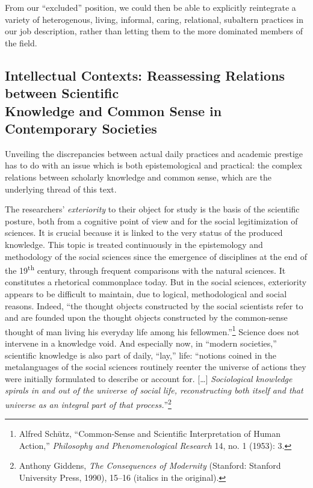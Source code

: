\documentclass{tufte-handout}
\begin{document}
From our ``excluded'' position, we could then be able to explicitly
reintegrate a variety of heterogenous, living, informal, caring,
relational, subaltern practices in our job description, rather than
letting them to the more dominated members of the field.

\hypertarget{intellectual-contexts-reassessing-relations-between-scientific-knowledge-and-common-sense-in-contemporary-societies}{%
\subsection{Intellectual Contexts: Reassessing
Relations between Scientific\\\noindent Knowledge and Common Sense in Contemporary
Societies}\label{intellectual-contexts-reassessing-relations-between-scientific-knowledge-and-common-sense-in-contemporary-societies}}

Unveiling the discrepancies between actual daily practices and academic
prestige has to do with an issue which is both epistemological and
practical: the complex relations between scholarly knowledge and common
sense, which are the underlying thread of this text.

The researchers' \emph{exteriority} to their object for study is the
basis of the scientific posture, both from a cognitive point of view and
for the social legitimization of sciences. It is crucial because it is
linked to the very status of the produced knowledge. This topic is
treated continuously in the epistemology and methodology of the social
sciences since the emergence of disciplines at the end of the
19\textsuperscript{th} century, through frequent comparisons with the
natural sciences. It constitutes a rhetorical commonplace today. But in
the social sciences, exteriority appears to be difficult to maintain,
due to logical, methodological and social reasons. Indeed, ``the thought
objects constructed by the social scientists refer to and are founded
upon the thought objects constructed by the common-sense thought of man
living his everyday life among his fellowmen.''\footnote{Alfred Schütz,
  ``Common-Sense and Scientific Interpretation of Human Action,''
  \emph{Philosophy and Phenomenological Research} 14, no. 1 (1953): 3.}
Science does not intervene in a knowledge void. And especially now, in
``modern societies,'' scientific knowledge is also part of daily,
``lay,'' life: ``notions coined in the metalanguages of the social
sciences routinely reenter the universe of actions they were initially
formulated to describe or account for. {[}\ldots{]} \emph{Sociological
knowledge spirals in and out of the universe of social life,
reconstructing both itself and that universe as an integral part of that
process.}''\footnote{Anthony Giddens, \emph{The Consequences of
  Modernity} (Stanford: Stanford University Press, 1990), 15--16
  (italics in the original).}
\end{document}
